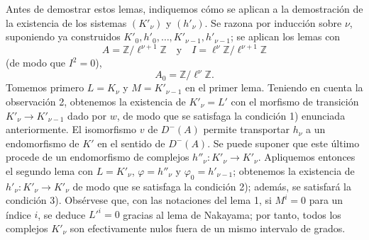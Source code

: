 Antes de demostrar estos lemas, indiquemos cómo se aplican a la demostración de la existencia de los sistemas $(K'_\nu)$ y $(h'_\nu)$. Se razona por inducción sobre $\nu$, suponiendo ya construidos $K'_0,h'_0,\ldots,K'_{\nu-1},h'_{\nu-1}$; se aplican los lemas con
\[
A=\mathbb Z/\ell^{\nu+1}\mathbb Z
\quad\text{y}\quad
I=\ell^\nu\mathbb Z/\ell^{\nu+1}\mathbb Z
\]
(de modo que $I^2=0$),
\[
A_0=\mathbb Z/\ell^\nu\mathbb Z.
\]
Tomemos primero $L=K_\nu$ y $M=K'_{\nu-1}$ en el primer lema. Teniendo en cuenta la observación 2, obtenemos la existencia de $K'_\nu=L'$ con el morfismo de transición $K'_\nu\to K'_{\nu-1}$ dado por $w$, de modo que se satisfaga la condición 1) enunciada anteriormente. El isomorfismo $v$ de $D^-(A)$ permite transportar $h_\nu$ a un endomorfismo de $K'$ en el sentido de $D^-(A)$. Se puede suponer que este último procede de un endomorfismo de complejos $h''_\nu:K'_\nu\to K'_\nu$. Apliquemos entonces el segundo lema con $L=K'_\nu$, $\varphi=h''_\nu$ y $\varphi_0=h'_{\nu-1}$; obtenemos la existencia de $h'_\nu:K'_\nu\to K'_\nu$ de modo que se satisfaga la condición 2); además, se satisfará la condición 3). Obsérvese que, con las notaciones del lema 1, si $M^i=0$ para un índice $i$, se deduce $L'^i=0$ gracias al lema de Nakayama; por tanto, todos los complejos $K'_\nu$ son efectivamente nulos fuera de un mismo intervalo de grados.
